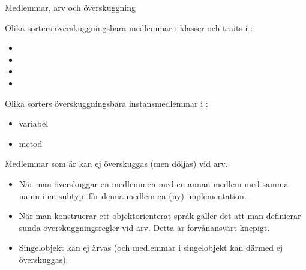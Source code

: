 





\begin{Slide}{Medlemmar, arv och överskuggning}\SlideFontTiny
\begin{multicols}{2}
Olika sorters överskuggningsbara medlemmar i klasser och traits i :
\begin{itemize}
\item {}
\item {}
\item {}
\item {}
\end{itemize}


\columnbreak

\pause

Olika sorters överskuggningsbara instansmedlemmar i :
\begin{itemize}
\item variabel
\item metod
\end{itemize}

{\SlideFontTiny Medlemmar som är  kan ej överskuggas (men döljas) vid arv.}

\vspace{0.5em}
\end{multicols}

\pause
\begin{itemize}\SlideFontTiny
\item När man överskuggar  en medlemmen med en annan medlem med samma namn i en subtyp, får denna medlem en (ny) implementation.

\item När man konstruerar ett objektorienterat språk gäller det att man definierar sunda överskuggningsregler vid arv. Detta är förvånansvärt knepigt.

\item Singelobjekt kan ej ärvas (och medlemmar i singelobjekt kan därmed ej överskuggas).
\end{itemize}
\end{Slide}


